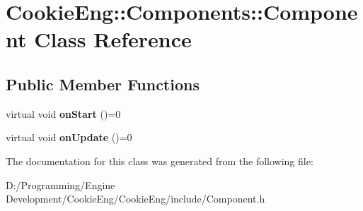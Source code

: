 \hypertarget{class_cookie_eng_1_1_components_1_1_component}{}\section{Cookie\+Eng\+:\+:Components\+:\+:Component Class Reference}
\label{class_cookie_eng_1_1_components_1_1_component}
\subsection*{Public Member Functions}
\begin{DoxyCompactItemize}
\item 
\mbox{\label{class_cookie_eng_1_1_components_1_1_component_aff030998db121bdb3dc3970c1ea9050e}} 
virtual void {\bfseries on\+Start} ()=0
\item 
\mbox{\label{class_cookie_eng_1_1_components_1_1_component_af8be8aaa70ee7bf1b97967399960f5ca}} 
virtual void {\bfseries on\+Update} ()=0
\end{DoxyCompactItemize}


The documentation for this class was generated from the following file\+:\begin{DoxyCompactItemize}
\item 
D\+:/\+Programming/\+Engine Development/\+Cookie\+Eng/\+Cookie\+Eng/include/Component.\+h\end{DoxyCompactItemize}
